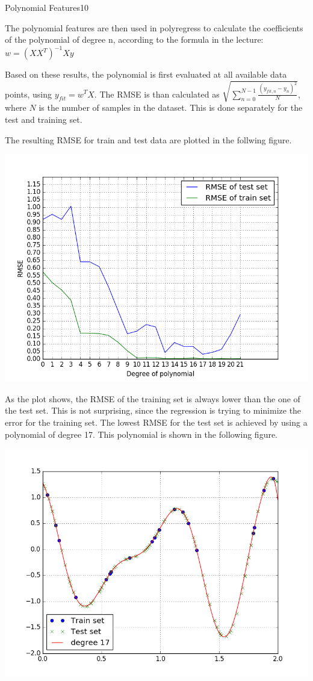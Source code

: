 \begin{questions}
\begin{question}{Polynomial Features}{10}
\begin{answer}
The polynomial features are then used in polyregress to calculate the coefficients of the polynomial of degree n, according to the formula in the lecture: $w=(XX^T)^{-1}Xy$



Based on these results, the polynomial is first evaluated at all available data points, using $y_{fit} = w^TX$. The RMSE is than calculated as $\sqrt{\sum_{n=0}^{N-1}\frac{ (y_{fit,n}-y_n)^2}{N}}$, where $N$ is the number of samples in the dataset. This is done separately for the test and training set.



The resulting RMSE for train and test data are plotted in the follwing figure.

\centering \includegraphics[width=0.7\linewidth]{img/31a}

As the plot shows, the RMSE of the training set is always lower than the one of the test set. This is not surprising, since the regression is trying to minimize the error for the training set. The lowest RMSE for the test set is achieved by using a polynomial of degree 17. This polynomial is shown in the following figure.

\centering \includegraphics[width=0.7\linewidth]{img/31a2}


\end{answer}
\end{question}
\end{questions}
